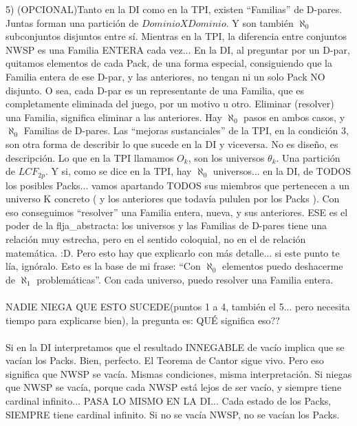 	5) (OPCIONAL)Tanto en la DI como en la TPI, existen ``Familias'' de D-pares. Juntas forman una partición de $Dominio X Dominio$. Y son también $\aleph_{0}$ subconjuntos disjuntos entre sí. Mientras en la TPI, la diferencia entre conjuntos NWSP es una Familia ENTERA cada vez... En la DI, al preguntar por un D-par, quitamos elementos de cada Pack, de una forma especial, consiguiendo que la Familia entera de ese D-par, y las anteriores, no tengan ni un solo Pack NO disjunto. O sea, cada D-par es un representante de una Familia, que es completamente eliminada del juego, por un motivo u otro. Eliminar (resolver) una Familia, significa eliminar a las anteriores. Hay $\aleph_{0}$ pasos en ambos casos, y $\aleph_{0}$ Familias de D-pares. Las ``mejoras sustanciales'' de la TPI, en la condición 3, son otra forma de describir lo que sucede en la DI y viceversa. No es diseño, es descripción. Lo que en la TPI llamamos $O_{k}$, son los universos $\theta_{k}$. Una partición de $LCF_{2p}$. Y si, como se dice en la TPI, hay $\aleph_{0}$ universos... en la DI, de TODOS los posibles Packs... vamos apartando TODOS sus miembros que pertenecen a un universo K concreto ( y los anteriores que todavía pululen por los Packs ). Con eso conseguimos ``resolver'' una Familia entera, nueva, y sus anteriores. ESE es el poder de la flja\_abstracta: los universos y las Familias de D-pares tiene una relación muy estrecha, pero en el sentido coloquial, no en el de relación matemática. :D. Pero esto hay que explicarlo con más detalle... si este punto te lía, ignóralo. Esto es la base de mi frase: ``Con $\aleph_{0}$ elementos puedo deshacerme de $\aleph_{1}$ problemáticas''. Con cada universo, puedo resolver una Familia entera.
	\\\\
	
	\noindent
	NADIE NIEGA QUE ESTO SUCEDE(puntos 1 a 4, también el 5... pero necesita tiempo para explicarse bien), la pregunta es: QUÉ significa eso??
	\\\\
	
	\noindent
	Si en la DI interpretamos que el resultado INNEGABLE de vacío implica que se vacían los Packs. Bien, perfecto. El Teorema de Cantor sigue vivo. Pero eso significa que NWSP se vacía. Mismas condiciones, misma interpretación. Si niegas que NWSP se vacía, porque cada NWSP está lejos de ser vacío, y siempre tiene cardinal infinito... PASA LO MISMO EN LA DI... Cada estado de los Packs, SIEMPRE tiene cardinal infinito. Si no se vacía NWSP, no se vacían los Packs.
	\\\\
	
